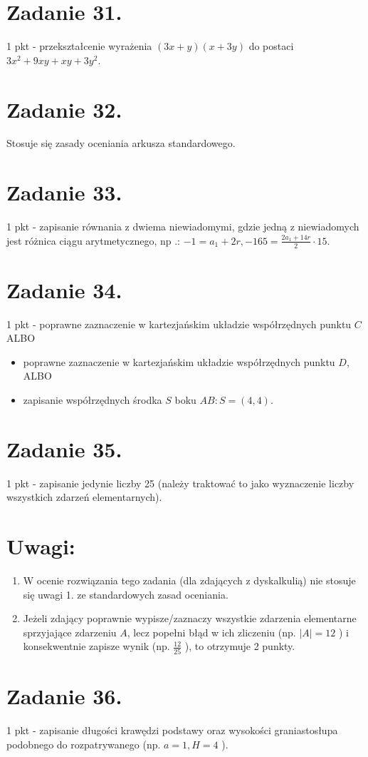 \documentclass[10pt]{article}
\begin{document}
\section*{Zadanie 31.}
1 pkt - przekształcenie wyrażenia $(3 x+y)(x+3 y)$ do postaci $3 x^{2}+9 x y+x y+3 y^{2}$.

\section*{Zadanie 32.}
Stosuje się zasady oceniania arkusza standardowego.

\section*{Zadanie 33.}
1 pkt - zapisanie równania z dwiema niewiadomymi, gdzie jedną z niewiadomych jest różnica ciągu arytmetycznego, np .: $-1=a_{1}+2 r,-165=\frac{2 a_{1}+14 r}{2} \cdot 15$.

\section*{Zadanie 34.}
1 pkt - poprawne zaznaczenie w kartezjańskim układzie współrzędnych punktu $C$ ALBO

\begin{itemize}
  \item poprawne zaznaczenie w kartezjańskim układzie współrzędnych punktu $D$, ALBO
  \item zapisanie współrzędnych środka $S$ boku $A B: S=(4,4)$.
\end{itemize}

\section*{Zadanie 35.}
1 pkt - zapisanie jedynie liczby 25 (należy traktować to jako wyznaczenie liczby wszystkich zdarzeń elementarnych).

\section*{Uwagi:}
\begin{enumerate}
  \item W ocenie rozwiązania tego zadania (dla zdających z dyskalkulią) nie stosuje się uwagi 1. ze standardowych zasad oceniania.
  \item Jeżeli zdający poprawnie wypisze/zaznaczy wszystkie zdarzenia elementarne sprzyjające zdarzeniu $A$, lecz popełni błąd w ich zliczeniu (np. $|A|=12$ ) i konsekwentnie zapisze wynik (np. $\frac{12}{25}$ ), to otrzymuje 2 punkty.
\end{enumerate}

\section*{Zadanie 36.}
1 pkt - zapisanie długości krawędzi podstawy oraz wysokości graniastosłupa podobnego do rozpatrywanego (np. $a=1, H=4$ ).
\end{document}
